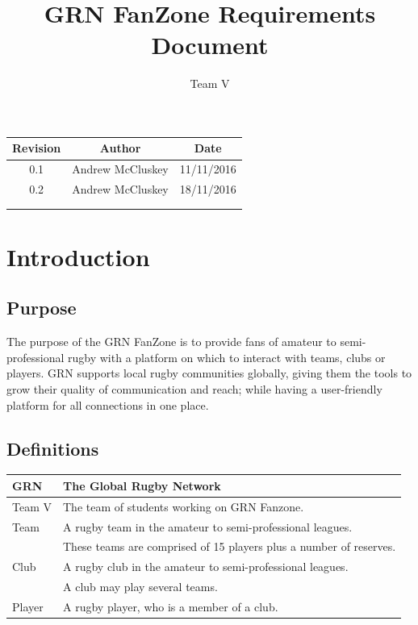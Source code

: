 \documentclass[10pt,a4paper]{article}
\author{Team V}
\title{GRN FanZone Requirements Document}
\begin{document}
\maketitle

\begin{center}
	\begin{tabular}{ |c|c|c| }
	\hline
	Revision & Author & Date \\ 
	\hline
	0.1 & Andrew McCluskey & 11/11/2016 \\
	\hline
	0.2 & Andrew McCluskey & 18/11/2016 \\
	\hline
	& & \\
	\hline
	& & \\
	\hline
	\end{tabular}
\end{center}

\newpage
\tableofcontents
\newpage

\section{Introduction}

\subsection{Purpose}
The purpose of the GRN FanZone is to provide fans of amateur to semi-professional rugby with a platform on which to interact with teams, clubs or players. GRN supports local rugby communities globally, giving them the tools to grow their quality of communication and reach; while having a user-friendly platform for all connections in one place.

\subsection{Definitions}

\begin{tabular}{ |l|l| }
\hline
GRN & The Global Rugby Network \\ 
\hline
Team V & The team of students working on GRN Fanzone. \\
\hline
Team & A rugby team in the amateur to semi-professional leagues. \\
&These teams are comprised of 15 players plus a number of reserves. \\
\hline
Club & A rugby club in the amateur to semi-professional leagues. \\
&A club may play several teams. \\
\hline
Player & A rugby player, who is a member of a club. \\
\hline
\end{tabular}
\end{document}
